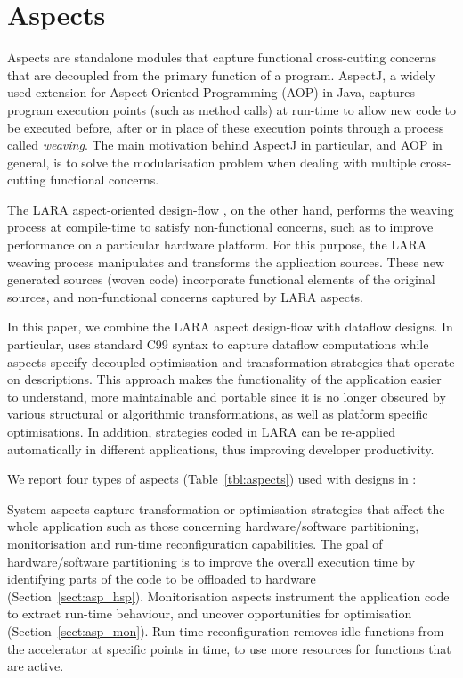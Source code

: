 \section{Aspects}
\label{sec:aspects}

Aspects are standalone modules that capture functional cross-cutting
concerns that are decoupled from the primary function of a
program. AspectJ\cite{Kiczales:2005:AP:1062455.1062640}, a widely
used extension for Aspect-Oriented Programming (AOP) in Java, captures
program execution points (such as method calls) at run-time to allow
new code to be executed before, after or in place of these execution
points through a process called \emph{weaving}. The main motivation
behind AspectJ in particular, and AOP in general, is to solve the
modularisation problem when dealing with multiple cross-cutting
functional concerns.

The LARA aspect-oriented
design-flow \cite{Cardoso:Carvalho:Cutinho:Luk:Nobre:Diniz:Petrov:2012},
on the other hand, performs the weaving process at compile-time to
satisfy non-functional concerns, such as to improve performance on a
particular hardware platform. For this purpose, the LARA weaving
process manipulates and transforms the application sources. These new
generated sources (woven code) incorporate functional elements of the
original sources, and non-functional concerns captured by LARA
aspects.

In this paper, we combine the LARA aspect design-flow with \MAXC{}
dataflow designs. In particular, \MAXC{} uses standard C99 syntax to
capture dataflow computations while aspects specify decoupled
optimisation and transformation strategies that operate on \MAXC{}
descriptions. This approach makes the functionality of the application
easier to understand, more maintainable and portable since it is no
longer obscured by various structural or algorithmic transformations,
as well as platform specific optimisations. In addition, strategies
coded in LARA can be re-applied automatically in different
applications, thus improving developer productivity.

We report four types of aspects (Table~\ref{tbl:aspects}) used with
designs in \MAXC{}:

\vspace*{0.5ex}
 System aspects capture transformation
or optimisation strategies that affect the whole application such as
those concerning hardware/software partitioning, monitorisation and
run-time reconfiguration capabilities. The goal of hardware/software
partitioning is to improve the overall execution time by identifying
parts of the code to be offloaded to hardware
(Section~\ref{sect:asp_hsp}). Monitorisation aspects instrument the
application code to extract run-time behaviour, and uncover
opportunities for optimisation (Section~\ref{sect:asp_mon}). Run-time
reconfiguration removes idle functions from the accelerator at
specific points in time, to use more resources for functions that are
active.

